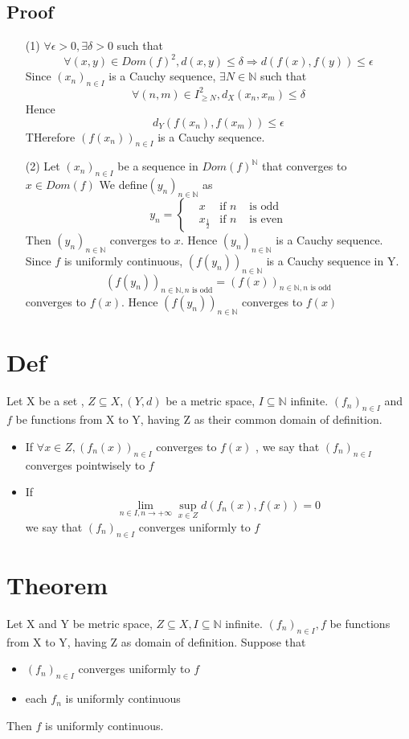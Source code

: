 \documentclass{book}
\begin{document}
\subsection{Proof}
\begin{itemize}
    \item [(1)]$\forall \epsilon>0, \exists\delta>0$ such that $$\forall(x,y)\in Dom(f)^2, d(x,y)\leq \delta \Rightarrow d(f(x),f(y))\leq\epsilon$$ Since $(x_n)_{n\in I}$ is a Cauchy sequence, $\exists N\in \mathbb{N} $ such that
    $$\forall(n,m)\in I_{\geq N}^2,d_X(x_n,x_m)\leq\delta$$ Hence $$d_Y(f(x_n),f(x_m))\leq\epsilon$$ THerefore $(f(x_n))_{n\in I}$ is a Cauchy sequence.
    \item [(2)]Let $(x_n)_{n\in I}$ be a sequence in $Dom(f)^\mathbb{N} $ that converges to $x\in Dom(f)$ We define$(y_n)_{n\in\mathbb{N} }$ as$$y_n=\left\{\begin{aligned}
        &x &\text{if } n &\text{ is odd}\\
        &x_{\frac{1}{2}} &\text{if } n &\text{ is even}
    \end{aligned}\right.$$Then $(y_n)_{n\in \mathbb{N} }$ converges to $x$. Hence $(y_n)_{n\in \mathbb{N} }$ is a Cauchy sequence. Since $f$ is uniformly continuous, $(f(y_n))_{n\in \mathbb{N} }$ is a Cauchy sequence in Y. $$(f(y_n))_{n\in \mathbb{N} ,n\text{ is odd}}=(f(x))_{n\in \mathbb{N} ,n\text{ is odd}}$$ converges to $f(x)$. Hence $(f(y_n))_{n\in \mathbb{N} }$ converges to $f(x)$
\end{itemize}
\section{Def} Let X be a set , $Z\subseteq X,(Y,d)$ be a metric space, $I\subseteq \mathbb{N} $ infinite. $(f_n)_{n\in I}$ and $f$ be functions from X to Y, having Z as their common domain of definition.
\begin{itemize}
    \item If $\forall x\in Z, (f_n(x))_{n\in I}$ converges to $f(x)$ , we say that $(f_n)_{n\in I}$ converges pointwisely to $f$
    \item If $$\lim\limits_{n\in I,n\rightarrow+\infty}\sup\limits_{x\in Z}d(f_n(x),f(x))=0$$ we say that $(f_n)_{n\in I}$ converges uniformly to $f$
\end{itemize}
\section{Theorem}
Let X and Y be metric space, $Z\subseteq X, I\subseteq \mathbb{N} $ infinite. $(f_n)_{n\in I},f$ be functions from X to Y, having Z as domain of definition.
Suppose that \begin{itemize}
    \item $(f_n)_{n\in I}$ converges uniformly to $f$
    \item each $f_n$ is uniformly continuous
\end{itemize}
Then $f$ is uniformly continuous.
\end{document}
